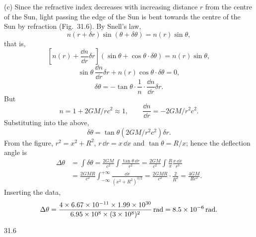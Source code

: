 (c) Since the refractive index decreases with increasing distance $r$ from the centre of the Sun, light passing the edge of the Sun is bent towards the centre of the Sun by refraction (Fig.~31.6). By Snell's law,
\begin{equation*}
n(r+\delta r)\sin(\theta+\delta\theta)=n(r)\sin\theta ,
\end{equation*}
that is,
\begin{equation*}
\left[n(r)+\frac{\dd n}{\dd r}\delta r\right]
\left(\sin\theta+\cos\theta\cdot\delta\theta\right)=n(r)\sin\theta ,
\end{equation*}
\begin{equation*}
\sin\theta\,\frac{\dd n}{\dd r}\delta r+n(r)\cos\theta\cdot\delta\theta=0 ,
\end{equation*}
\begin{equation*}
\delta\theta=-\tan\theta\cdot\frac{1}{n}\cdot\frac{\dd n}{\dd r}\delta r .
\end{equation*}
But
\begin{equation*}
n=1+2GM/rc^2\approx1,\qquad
\frac{\dd n}{\dd r}=-2GM/r^2c^2 .
\end{equation*}
Substituting into the above,
\begin{equation*}
\delta\theta=\tan\theta\left(2GM/r^2c^2\right)\delta r .
\end{equation*}
From the figure, $r^2=x^2+R^2$, $r\,\dd r=x\,\dd x$ and $\tan\theta=R/x$; hence the deflection angle is
\begin{align*}
\Delta\theta&=\int\delta\theta
=\frac{2GM}{c^2}\int\frac{\tan\theta\,\dd r}{r^2}
=\frac{2GM}{c^2}\int\frac{R}{x}\frac{x\,\dd x}{r^3}\\
&=\frac{2GMR}{c^2}\int_{-\infty}^{+\infty}
\frac{\dd x}{(x^2+R^2)^{3/2}}
=\frac{2GMR}{c^2}\cdot\frac{2}{R^2}
=\frac{4GM}{Rc^2} .
\end{align*}
Inserting the data,
\begin{equation*}
\Delta\theta=\frac{4\times6.67\times10^{-11}\times1.99\times10^{30}}
{6.95\times10^8\times(3\times10^8)^2}\,\mathrm{rad}
=8.5\times10^{-6}\,\mathrm{rad} .
\end{equation*}

\begin{figbox}{31.6}
\end{figbox}


